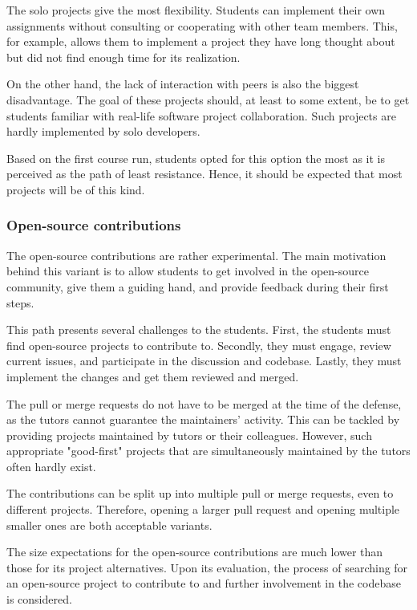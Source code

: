 \documentclass[
  digital,
  color,
  oneside,
  nosansbold,
  nocolorbold,
  nolof,
  nolot,
]{fithesis4}
\begin{document}
The solo projects give the most flexibility. Students can implement their own assignments without consulting or cooperating with other team members. This, for example, allows them to implement a project they have long thought about but did not find enough time for its realization.

On the other hand, the lack of interaction with peers is also the biggest disadvantage. The goal of these projects should, at least to some extent, be to get students familiar with real-life software project collaboration. Such projects are hardly implemented by solo developers.

Based on the first course run, students opted for this option the most as it is perceived as the path of least resistance. Hence, it should be expected that most projects will be of this kind.

\subsubsection{Open-source contributions}

The open-source contributions are rather experimental. The main motivation behind this variant is to allow students to get involved in the open-source community, give them a guiding hand, and provide feedback during their first steps. 

This path presents several challenges to the students. First, the students must find open-source projects to contribute to. Secondly, they must engage, review current issues, and participate in the discussion and codebase. Lastly, they must implement the changes and get them reviewed and merged.

The pull or merge requests do not have to be merged at the time of the defense, as the tutors cannot guarantee the maintainers' activity. This can be tackled by providing projects maintained by tutors or their colleagues. However, such appropriate "good-first" projects that are simultaneously maintained by the tutors often hardly exist.

The contributions can be split up into multiple pull or merge requests, even to different projects. Therefore, opening a larger pull request and opening multiple smaller ones are both acceptable variants.

The size expectations for the open-source contributions are much lower than those for its project alternatives. Upon its evaluation, the process of searching for an open-source project to contribute to and further involvement in the codebase is considered.
\end{document}

